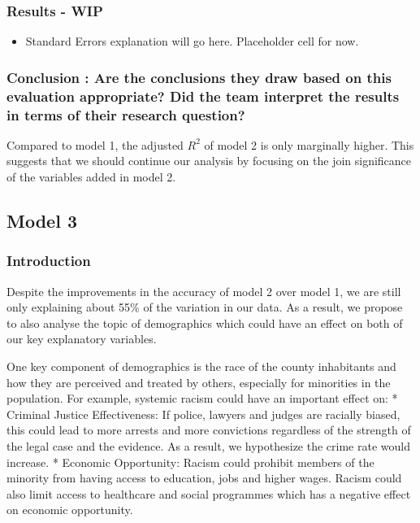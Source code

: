 \documentclass[]{article}
\providecommand{\tightlist}{%
  \setlength{\itemsep}{0pt}\setlength{\parskip}{0pt}}
\begin{document}
\hypertarget{results---wip}{%
\subsubsection{\texorpdfstring{Results -
\textbf{WIP}}{Results - WIP}}\label{results---wip}}

\begin{itemize}
\tightlist
\item
  Standard Errors explanation will go here. Placeholder cell for now.
\end{itemize}

\hypertarget{conclusion-are-the-conclusions-they-draw-based-on-this-evaluation-appropriate-did-the-team-interpret-the-results-in-terms-of-their-research-question}{%
\subsubsection{Conclusion : Are the conclusions they draw based on this
evaluation appropriate? Did the team interpret the results in terms of
their research
question?}\label{conclusion-are-the-conclusions-they-draw-based-on-this-evaluation-appropriate-did-the-team-interpret-the-results-in-terms-of-their-research-question}}

Compared to model 1, the adjusted \(R^2\) of model 2 is only marginally
higher. This suggests that we should continue our analysis by focusing
on the join significance of the variables added in model 2.

\hypertarget{model-3}{%
\subsection{Model 3}\label{model-3}}

\hypertarget{introduction-3}{%
\subsubsection{Introduction}\label{introduction-3}}

Despite the improvements in the accuracy of model 2 over model 1, we are
still only explaining about 55\% of the variation in our data. As a
result, we propose to also analyse the topic of demographics which could
have an effect on both of our key explanatory variables.

One key component of demographics is the race of the county inhabitants
and how they are perceived and treated by others, especially for
minorities in the population. For example, systemic racism could have an
important effect on: * Criminal Justice Effectiveness: If police,
lawyers and judges are racially biased, this could lead to more arrests
and more convictions regardless of the strength of the legal case and
the evidence. As a result, we hypothesize the crime rate would increase.
* Economic Opportunity: Racism could prohibit members of the minority
from having access to education, jobs and higher wages. Racism could
also limit access to healthcare and social programmes which has a
negative effect on economic opportunity.
\end{document}

